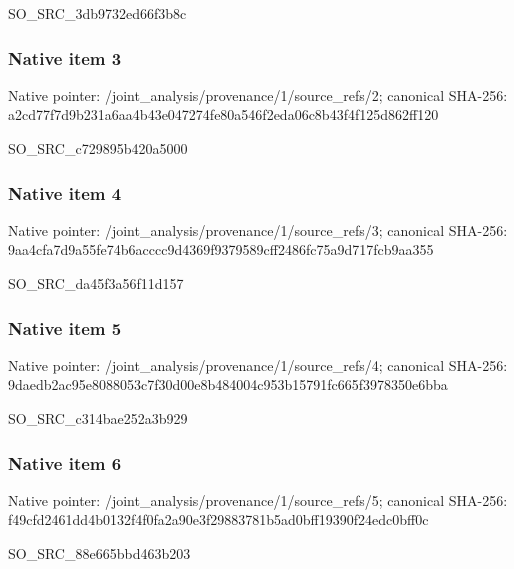 \documentclass[10pt,a4paper]{article}
\begin{document}
\begingroup\raggedright\sloppy SO\_\allowbreak{}SRC\_\allowbreak{}3db9732ed66f3b8c\par\endgroup

\subsubsection{Native item 3}
Native pointer: /joint\_\allowbreak{}analysis/provenance/1/source\_\allowbreak{}refs/2; canonical SHA-256: a2cd77f7d9b231a6aa4b43e047274fe80a546f2eda06c8b43f4f125d862ff120

\begingroup\raggedright\sloppy SO\_\allowbreak{}SRC\_\allowbreak{}c729895b420a5000\par\endgroup

\subsubsection{Native item 4}
Native pointer: /joint\_\allowbreak{}analysis/provenance/1/source\_\allowbreak{}refs/3; canonical SHA-256: 9aa4cfa7d9a55fe74b6acccc9d4369f9379589cff2486fc75a9d717fcb9aa355

\begingroup\raggedright\sloppy SO\_\allowbreak{}SRC\_\allowbreak{}da45f3a56f11d157\par\endgroup

\subsubsection{Native item 5}
Native pointer: /joint\_\allowbreak{}analysis/provenance/1/source\_\allowbreak{}refs/4; canonical SHA-256: 9daedb2ac95e8088053c7f30d00e8b484004c953b15791fc665f3978350e6bba

\begingroup\raggedright\sloppy SO\_\allowbreak{}SRC\_\allowbreak{}c314bae252a3b929\par\endgroup

\subsubsection{Native item 6}
Native pointer: /joint\_\allowbreak{}analysis/provenance/1/source\_\allowbreak{}refs/5; canonical SHA-256: f49cfd2461dd4b0132f4f0fa2a90e3f29883781b5ad0bff19390f24edc0bff0c

\begingroup\raggedright\sloppy SO\_\allowbreak{}SRC\_\allowbreak{}88e665bbd463b203\par\endgroup
\end{document}
